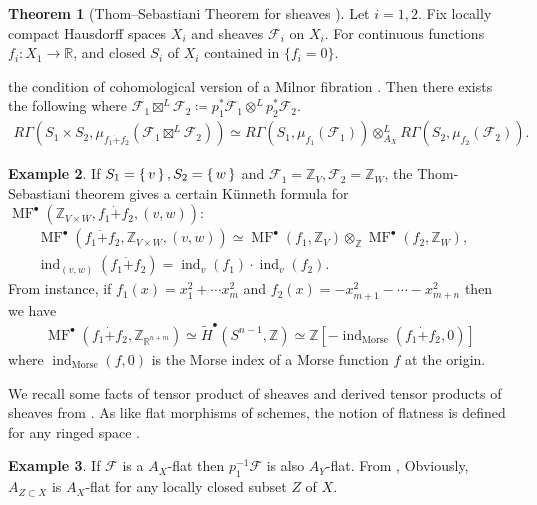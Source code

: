 \documentclass[a4paper,dvipdfmx,reqno,12pt]{amsart}
\theoremstyle{definition}
\newtheorem{theorem}{Theorem}[section]
\newtheorem{example}[theorem]{Example}
\newcommand{\deq}{\coloneqq}
\newcommand{\Z}{\mathbb{Z}}%
\newcommand{\mcal}[1]{\mathcal{#1}}%
\newcommand{\opn}[1]{\operatorname{#1}}
\numberwithin{equation}{section}
\begin{document}
\begin{theorem}[{Thom--Sebastiani Theorem for sheaves \cite[Theorem 1.2.2]{MR2031639}}]
Let $i=1,2$.
Fix locally compact Hausdorff spaces $X_i$ and 
sheaves $\mathcal{F}_i$ on $X_i$.
For continuous functions $f_i\colon X_1 \to\mathbb{R}$,
and closed $S_i$ of $X_i$ contained in $\{f_i=0\}$.

the condition of cohomological version of a Milnor 
fibration \cite[Assumption 1.1.1]{MR2031639}.
Then there exists the following
where $\mcal{F}_1\boxtimes^{L} \mcal{F}_2\deq p_1^{*}\mcal{F}_1\otimes^{L}p^{*}_2\mcal{F}_2$.
  \begin{align}
    R\Gamma(S_1\times S_2,\mu_{f_1\dot{+}f_2}(\mcal{F}_1\boxtimes^{L} \mcal{F}_2))
    \simeq R\Gamma(S_1,\mu_{f_1}(\mcal{F}_1))
    \otimes^{L}_{A_X}R\Gamma(S_2,\mu_{f_2}(\mcal{F}_2)).
  \end{align}

\end{theorem}


\begin{example}
  If $S_1=\set{v},S_2=\set{w}$ and $\mcal{F}_1=\Z_V, \mcal{F}_2=\Z_{W}$,
  the Thom-Sebastiani theorem gives
  a certain K\"unneth formula for
  $\opn{MF}^{\bullet}(\Z_{V\times W},f_1\dot{+}f_2,(v,w))$:
\begin{align}
\opn{MF}^{\bullet}(f_1\dot{+}f_2,\Z_{V\times W},(v,w))
\simeq \opn{MF}^{\bullet}(f_1,\Z_{V})
\otimes_{\Z} \opn{MF}^{\bullet}(f_2,\Z_{W}), \quad \\
\opn{ind}_{(v,w)}(f_1\dot{+}f_2)=\opn{ind}_v(f_1)\cdot \opn{ind}_v(f_2).
\end{align}
  From instance, if $f_1(x)=x_1^{2}+\cdots x_{m}^{2}$
  and $f_2(x)=-x_{m+1}^{2}-\cdots - x_{m+n}^{2}$ then we have
\begin{align}
    \opn{MF}^{\bullet}(f_1\dot{+}f_2,\Z_{{\mathbb{R}}^{n+m}})
    \simeq \tilde{H}^{\bullet}(S^{n-1},\Z)
    \simeq \Z[-\opn{ind}_{\mathrm{Morse}}(f_1\dot{+}f_2,0)]
\end{align}
  where $\opn{ind}_{\mathrm{Morse}}(f,0)$ is the Morse index
  of a Morse function $f$ at the origin.
\end{example}

We recall some facts of tensor product of sheaves 
and derived tensor products of sheaves from \cite{MR1299726}.
As like flat morphisms of schemes, the notion of flatness
is defined for any ringed space 
\cite[Definition 2.4.11]{MR1299726}.

\begin{example}

If $\mcal{F}$ is a $A_X$-flat then $p_1^{-1}\mcal{F}$ is also 
$A_Y$-flat. From \cite[(2.2.7)]{}, 
Obviously, $A_{Z\subset X}$ is $A_X$-flat for any locally 
closed subset $Z$ of $X$. 
\end{example}
\end{document}

